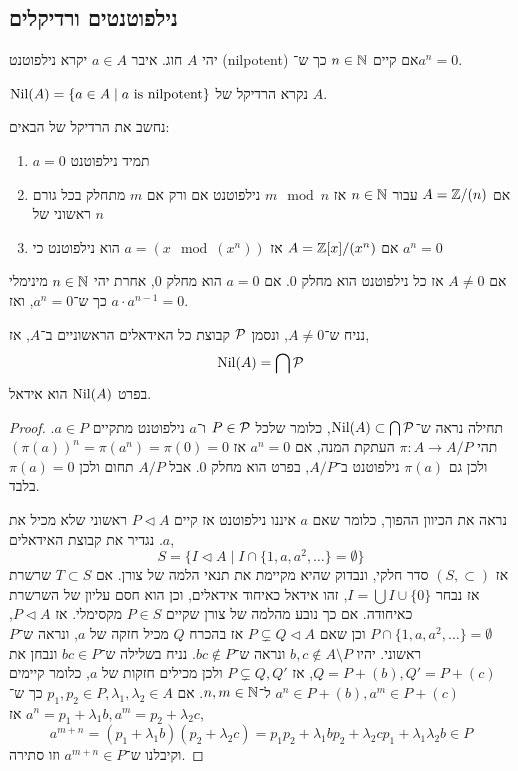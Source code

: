 \subsection{נילפוטנטים ורדיקלים}
\begin{definition}[נילפוטנט]
	יהי $A$ חוג.
	איבר $a \in A$ יקרא נילפוטנט (nilpotent) אם קיים $n \in \mathbb{N}$ כך ש־$a^n = 0$.
\end{definition}
\begin{definition}[רדיקל]
	$\operatorname{Nil}(A) = \{ a \in A \mid a \text{ is nilpotent} \}$ נקרא הרדיקל של $A$.
\end{definition}
\begin{example}
	נחשב את הרדיקל של הבאים:
	\begin{enumerate}
		\item $a = 0$ תמיד נילפוטנט
		\item אם $A = \mathbb{Z} / (n)$ עבור $n \in \mathbb{N}$ אז $m \mod n$ נילפוטנט אם ורק אם $m$ מתחלק בכל גורם ראשוני של $n$
		\item אם $A = \mathbb{Z}[x] / (x^n)$ אז $a = (x \mod (x^n))$ הוא נילפוטנט כי $a^n = 0$
	\end{enumerate}
\end{example}
\begin{remark}
	אם $A \ne 0$ אז כל נילפוטנט הוא מחלק 0.
	אם $a = 0$ הוא מחלק 0, אחרת יהי $n \in \mathbb{N}$ מינימלי כך ש־$a^n = 0$, ואז $a \cdot a^{n - 1} = 0$.
\end{remark}
\begin{theorem}
	נניח ש־$A \ne 0$, ונסמן $\mathcal{P}$ קבוצת כל האידאלים הראשוניים ב־$A$, אז,
	\[
		\operatorname{Nil}(A)
		= \bigcap \mathcal{P}
	\]
	בפרט $\operatorname{Nil}(A)$ הוא אידאל.
\end{theorem}
\begin{proof}
	תחילה נראה ש־$\operatorname{Nil}(A) \subset \bigcap \mathcal{P}$, כלומר שלכל $P \in \mathcal{P}$ ו־$a$ נילפוטנט מתקיים $a \in P$.
	תהי $\pi : A \to A / P$ העתקת המנה, אם $a^n = 0$ אז ${(\pi(a))}^n = \pi(a^n) = \pi(0) = 0$ ולכן גם $\pi(a)$ נילפוטנט ב־$A / P$, בפרט הוא מחלק 0.
	אבל $A / P$ תחום ולכן $\pi(a) = 0$ בלבד.

	נראה את הכיוון ההפוך, כלומר שאם $a$ איננו נילפוטנט אז קיים $P \triangleleft A$ ראשוני שלא מכיל את $a$.
	נגדיר את קבוצת האידאלים,
	\[
		S
		= \{ I \triangleleft A \mid I \cap \{1, a, a^2, \ldots\} = \emptyset \}
	\]
	אז $(S, \subset)$ סדר חלקי, ונבדוק שהיא מקיימת את תנאי הלמה של צורן.
	אם $T \subset S$ שרשרת אז נבחר $I = \bigcup I \cup \{ 0 \}$, זהו אידאל כאיחוד אידאלים, וכן הוא חסם עליון של השרשרת כאיחודה.
	אם כך נובע מהלמה של צורן שקיים $P \in S$ מקסימלי.
	אז $P \triangleleft A$, $P \cap \{1, a, a^2, \ldots\} = \emptyset$ וכן שאם $P \subsetneq Q \triangleleft A$ אז בהכרח $Q$ מכיל חזקה של $a$, ונראה ש־$P$ ראשוני.
	יהיו $b, c \notin A \setminus P$ ונראה ש־$b c \notin P$.
	נניח בשלילה ש־$b c \in P$ ונבחן את $Q = P + (b), Q' = P + (c)$, אז $P \subsetneq Q, Q'$ ולכן מכילים חזקות של $a$, כלומר קיימים $a^n \in P + (b), a^m \in P + (c)$ ל־$n, m \in \mathbb{N}$.
	אם $p_1, p_2 \in P, \lambda_1, \lambda_2 \in A$ כך ש־$a^n = p_1 + \lambda_1 b, a^m = p_2 + \lambda_2 c$ אז,
	\[
		a^{m + n}
		= (p_1 + \lambda_1 b)(p_2 + \lambda_2 c)
		= p_1 p_2 + \lambda_1 b p_2 + \lambda_2 c p_1 + \lambda_1 \lambda_2 b
		\in P
	\]
	וקיבלנו ש־$a^{m + n} \in P$ וזו סתירה.
\end{proof}
